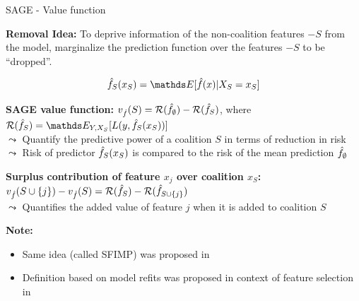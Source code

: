 \documentclass[11pt,compress,t,notes=noshow, aspectratio=169, xcolor=table]{beamer}
\begin{document}
\begin{frame}{SAGE - Value function}
  
 \textbf{Removal Idea:} %
 To deprive information of the non-coalition features $-S$ from the model, marginalize the prediction function over the features $-S$ to be ``dropped''.

$$\fh_S(x_S) = \E[\fh(x) | X_S = x_S]$$



\pause
\lz

\textbf{SAGE value function:}  $v_{\fh}(S) = \risk(\fh_{\emptyset}) - \risk(\fh_{S})$, where $\risk(\fh_{S}) = \E_{Y, X_S}[L(y, \fh_S(x_S))]$\\
$\leadsto$ Quantify the predictive power of a coalition $S$ in terms of reduction in risk \\
$\leadsto$ Risk of predictor $\fh_S(x_S)$ is compared to the risk of the mean prediction $\fh_{\emptyset}$


\pause
\lz

\textbf{Surplus contribution of feature $x_j$ over coalition $x_S$:}  $v_{\fh}(S \cup \{j\}) - v_{\fh}(S) = \risk(\fh_{S})-\risk(\fh_{S \cup \{j\}})$\\
$\leadsto$ Quantifies the added value of feature $j$ when it is added to coalition $S$

\pause
\lz

\textbf{Note:} 
\begin{itemize}
    \item Same idea (called SFIMP) was proposed in 
    \item Definition based on model refits was proposed in context of feature selection in 
\end{itemize}


\end{frame}
\end{document}
